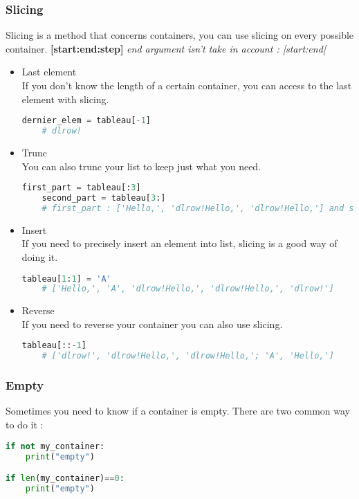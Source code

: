 \documentclass[a4paper, 12pt, titlepage]{scrartcl} %
\begin{document}
\subsubsection{Slicing}
Slicing is a method that concerns containers, you can use slicing on every possible container. \textbf{[start:end:step]} \textit{end argument isn't take in account : [start:end[}
\begin{itemize}
    \item Last element \\
    If you don't know the length of a certain container, you can access to the last element with slicing.
    \begin{lstlisting}[language=Python]
    dernier_elem = tableau[-1]
    # dlrow!
    \end{lstlisting} \vspace{5mm}
    
    \item Trunc \\
    You can also trunc your list to keep just what you need.
    \begin{lstlisting}[language=Python]
    first_part = tableau[:3]
    second_part = tableau[3:]
    # first_part : ['Hello,', 'dlrow!Hello,', 'dlrow!Hello,'] and second_part : ['dlrow!']
    \end{lstlisting} \vspace{5mm}
    
    \item Insert \\
    If you need to precisely insert an element into list, slicing is a good way of doing it.
    \begin{lstlisting}[language=Python]
    tableau[1:1] = 'A'
    # ['Hello,', 'A', 'dlrow!Hello,', 'dlrow!Hello,', 'dlrow!']
    \end{lstlisting} \vspace{5mm}
    
    \item Reverse \\
    If you need to reverse your container you can also use slicing.
    \begin{lstlisting}[language=Python]
    tableau[::-1]
    # ['dlrow!', 'dlrow!Hello,', 'dlrow!Hello,'; 'A', 'Hello,']
    \end{lstlisting} \vspace{5mm}
\end{itemize}

\subsubsection{Empty}
Sometimes you need to know if a container is empty. There are two common way to do it :
\begin{lstlisting}[language=Python]
if not my_container:
    print("empty")

if len(my_container)==0:
    print("empty")
\end{lstlisting} \vspace{5mm}
\end{document}
